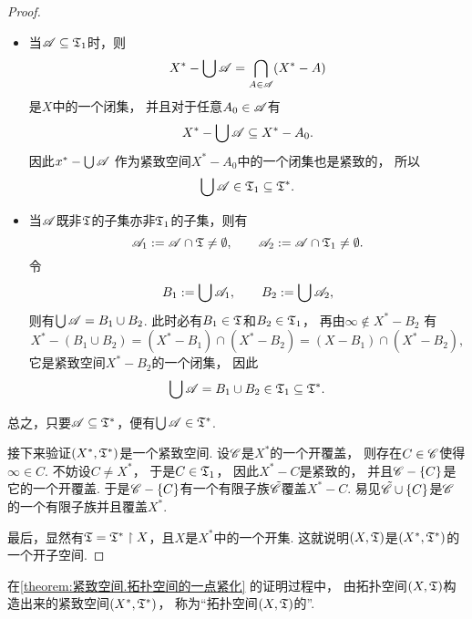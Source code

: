 \begin{theorem}
\begin{proof}
\begin{itemize}
\begin{itemize}
		\item 当\(\mathscr{A} \subseteq {\mathfrak T}_1\)时，则\begin{equation*}
			X^* - \bigcup \mathscr{A} = \bigcap_{A \in \mathscr{A}} (X^* - A)
		\end{equation*}
		是\(X\)中的一个闭集，
		并且对于任意\(A_0 \in \mathscr{A}\)有\begin{equation*}
			X^* - \bigcup \mathscr{A} \subseteq X^* - A_0.
		\end{equation*}
		因此\(x^* - \bigcup \mathscr{A}\)
		作为紧致空间\(X^* - A_0\)中的一个闭集也是紧致的，
		所以\begin{equation*}
			\bigcup \mathscr{A} \in {\mathfrak T}_1 \subseteq {\mathfrak T}^*.
		\end{equation*}

		\item 当\(\mathscr{A}\)既非\({\mathfrak T}\)的子集亦非\({\mathfrak T}_1\)的子集，则有\begin{equation*}
			\mathscr{A}_1 := \mathscr{A} \cap {\mathfrak T} \neq \emptyset,
			\qquad
			\mathscr{A}_2 := \mathscr{A} \cap {\mathfrak T}_1 \neq \emptyset.
		\end{equation*}
		令\begin{equation*}
			B_1 := \bigcup \mathscr{A}_1,
			\qquad
			B_2 := \bigcup \mathscr{A}_2,
		\end{equation*}
		则有\(\bigcup \mathscr{A} = B_1 \cup B_2\).
		此时必有\(B_1 \in {\mathfrak T}\)和\(B_2 \in {\mathfrak T}_1\)，
		再由\(\infty \notin X^* - B_2\)
		有\begin{equation*}
			X^* - (B_1 \cup B_2)
			= (X^* - B_1) \cap (X^* - B_2)
			= (X - B_1) \cap (X^* - B_2),
		\end{equation*}
		它是紧致空间\(X^* - B_2\)的一个闭集，
		因此\begin{equation*}
			\bigcup \mathscr{A}
			= B_1 \cup B_2
			\in {\mathfrak T}_1
			\subseteq {\mathfrak T}^*.
		\end{equation*}
	\end{itemize}
	总之，只要\(\mathscr{A} \subseteq {\mathfrak T}^*\)，便有\(\bigcup \mathscr{A}  \in {\mathfrak T}^*\).
\end{itemize}

接下来验证\((X^*,{\mathfrak T}^*)\)是一个紧致空间.
设\(\mathscr{C}\)是\(X^*\)的一个开覆盖，
则存在\(C \in \mathscr{C}\)使得\(\infty \in C\).
不妨设\(C \neq X^*\)，
于是\(C \in {\mathfrak T}_1\)，
因此\(X^* - C\)是紧致的，
并且\(\mathscr{C}-\{C\}\)是它的一个开覆盖.
于是\(\mathscr{C}-\{C\}\)有一个有限子族\(\tilde{\mathscr{C}}\)覆盖\(X^* - C\).
易见\(\tilde{\mathscr{C}} \cup \{C\}\)是\(\mathscr{C}\)的一个有限子族并且覆盖\(X^*\).

最后，显然有\({\mathfrak T} = {\mathfrak T}^* \upharpoonright X\)，且\(X\)是\(X^*\)中的一个开集.
这就说明\((X,{\mathfrak T})\)是\((X^*,{\mathfrak T}^*)\)的一个开子空间.
\end{proof}
\end{theorem}
\begin{definition}
在\cref{theorem:紧致空间.拓扑空间的一点紧化} 的证明过程中，
由拓扑空间\((X,{\mathfrak T})\)构造出来的紧致空间\((X^*,{\mathfrak T}^*)\)，
称为“拓扑空间\((X,{\mathfrak T})\)的”.
\end{definition}


